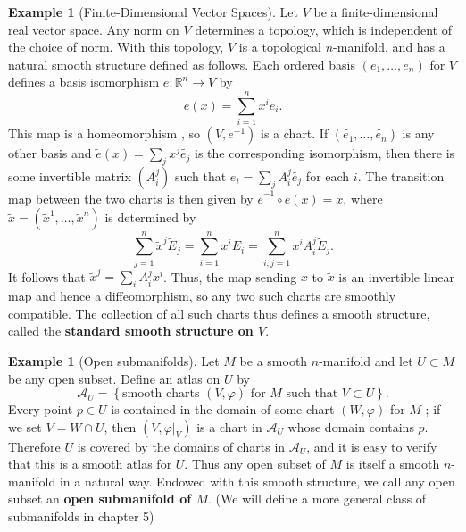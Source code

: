 \documentclass[reqno]{amsart}
\theoremstyle{plain}%
\theoremstyle{definition}
\newtheorem{example}[theorem]{Example}
\theoremstyle{remark}
\begin{document}
        \begin{example}[Finite-Dimensional Vector Spaces]
         Let $V$ be a finite-dimensional real vector space. Any norm on $V$ 
         determines a topology, which is independent of the choice of norm. With
         this topology, $V$ is a topological $n$-manifold, and has a natural smooth
         structure defined as follows. Each ordered basis
         $\left( e_1, \ldots, e_n \right) $ for $V$ defines a basis isomorphism
         $e  \colon \mathbb{R}^{n} \to V$ by
         \[
         e(x) = \sum_{i=1}^{n} x^{i} e_i.
         \] 
         This map is a homeomorphism 
         \cite[p~638]{Lee}, so $\left( V, e^{-1} \right) $ is a chart. If
         $\left( \tilde{e_1}, \ldots,
         \tilde{e_n} \right) $ is any other basis and
         $\tilde{e}(x) = \sum_{j} x^{j}\tilde{e_j} $ is the corresponding
         isomorphism, then there is some invertible matrix
         $\left( A_{i}^{j} \right) $ such that
         $e_i = \sum_j A_{i}^{j} \tilde{e_j}$ for each $i$. The transition map
         between the two charts is then given by
         $\tilde{e}^{-1} \circ e(x) = \tilde{x}$, where $\tilde{x}
         = \left( \tilde{x}^{1},\ldots, \tilde{x}^{n} \right) $
         is determined by
         \[
         \sum_{j=1}^{n} \tilde{x}^{j} \tilde{E}_j =
         \sum_{i=1}^{n} x^{i} E_i = \sum_{i,j=1}^{n} x^{i}A_{i}^{j}\tilde{E}_j.
         \] 
         It follows that $\tilde{x}^{j}=
         \sum_i A_i^{j} x^{i}$. Thus, the map sending $x$ to $\tilde{x}$ is an
         invertible linear map and hence a diffeomorphism, so any two such charts
         are smoothly compatible. The collection of all such charts thus defines
         a smooth structure, called the \textbf{standard smooth structure on $V$}.     
        \end{example}

        \begin{example}[Open submanifolds]
            Let $M$ be a smooth $n$-manifold and let $U \subset M$ be any open subset.
            Define an atlas on $U$ by
            \[
            \mathcal{A}_{U} = \left\{ \text{smooth charts }
            \left( V,\varphi \right) \text{ for }M \text{ such that }
            V \subset U \right\} .
            \] 
            Every point $p \in U$ is contained in the domain of some chart
            $\left( W, \varphi \right) $ for $M$ ; if we set
            $V = W \cap U$, then $\left( V, \varphi|_{V} \right) $ is a chart in
            $\mathcal{A}_U$ whose domain contains $p$. Therefore $U$ is covered by the
            domains of charts in $\mathcal{A}_U$, and it is easy to verify that this is
            a smooth atlas for $U$. Thus any open subset of $M$ is itself a smooth
            $n$-manifold in a natural way. Endowed with this smooth structure, we call
            any open subset an \textbf{open submanifold of $M$}. (We will define a more
            general class of submanifolds in chapter 5)
        \end{example}
        
\end{document}
